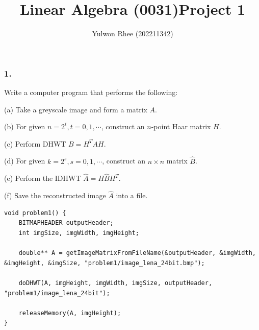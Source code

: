 



\title{Linear Algebra (0031)\newline\space Project 1}
\author{Yulwon Rhee (202211342)}

\maketitle

\subsubsection{1.}
Write a computer program that performs the following:

(a) Take a greyscale image and form a matrix $A$.

(b) For given $n = 2^t, t = 0, 1, \cdots$, construct an $n$-point Haar matrix $H$.

(c) Perform DHWT $B = H^TAH$.

(d) For given $k = 2^s, s = 0, 1, \cdots$, construct an $n \times n$ matrix $\hat{B}$.

(e) Perform the IDHWT $\hat{A} = H\hat{B} H^T$.

(f) Save the reconstructed image $\hat{A}$ into a file.

\begin{verbatim}
void problem1() {
    BITMAPHEADER outputHeader;
    int imgSize, imgWidth, imgHeight;

    double** A = getImageMatrixFromFileName(&outputHeader, &imgWidth, &imgHeight, &imgSize, "problem1/image_lena_24bit.bmp");

    doDHWT(A, imgHeight, imgWidth, imgSize, outputHeader, "problem1/image_lena_24bit");

    releaseMemory(A, imgHeight);
}
\end{verbatim}

